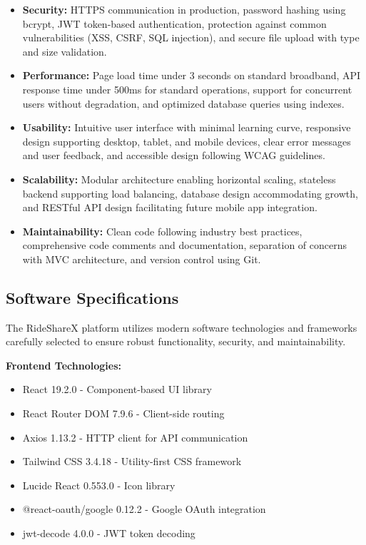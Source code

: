 \documentclass[12pt,a4paper]{report}
\begin{document}
	\begin{itemize}
		\item \textbf{Security:} HTTPS communication in production, password hashing using bcrypt, JWT token-based authentication, protection against common vulnerabilities (XSS, CSRF, SQL injection), and secure file upload with type and size validation.
		
		\item \textbf{Performance:} Page load time under 3 seconds on standard broadband, API response time under 500ms for standard operations, support for concurrent users without degradation, and optimized database queries using indexes.
		
		\item \textbf{Usability:} Intuitive user interface with minimal learning curve, responsive design supporting desktop, tablet, and mobile devices, clear error messages and user feedback, and accessible design following WCAG guidelines.
		
		\item \textbf{Scalability:} Modular architecture enabling horizontal scaling, stateless backend supporting load balancing, database design accommodating growth, and RESTful API design facilitating future mobile app integration.
		
		\item \textbf{Maintainability:} Clean code following industry best practices, comprehensive code comments and documentation, separation of concerns with MVC architecture, and version control using Git.
	\end{itemize}
	
	\subsection{Software Specifications}
	The RideShareX platform utilizes modern software technologies and frameworks carefully selected to ensure robust functionality, security, and maintainability.
	
	\textbf{Frontend Technologies:}
	\begin{itemize}
		\item React 19.2.0 - Component-based UI library
		\item React Router DOM 7.9.6 - Client-side routing
		\item Axios 1.13.2 - HTTP client for API communication
		\item Tailwind CSS 3.4.18 - Utility-first CSS framework
		\item Lucide React 0.553.0 - Icon library
		\item @react-oauth/google 0.12.2 - Google OAuth integration
		\item jwt-decode 4.0.0 - JWT token decoding
	\end{itemize}
	
\end{document}
